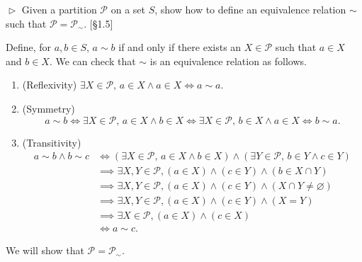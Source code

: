 \hypertarget{Exercise I.1.3}{}
\begin{problem}[1.3]
	$\vartriangleright$ Given a partition $\mathscr{P}$ on a set $S$, show how to define an equivalence relation $\sim$ such that $\mathscr{P} = \mathscr{P}_{\sim}$. [\S1.5]
\end{problem}

\begin{solution}
	Define, for $a,b\in S$, $a\sim b$ if and only if there exists
	an $X\in\mathscr{P}$ such that $a\in X$ and $b\in X$. We can check that $\sim$ is an equivalence relation as follows.
	\begin{enumerate}
		\item (Reflexivity) $\exists X\in\mathscr{P},\,a\in X \land a\in X\iff a\sim a$.
		\item (Symmetry) \[a\sim b\iff\exists X\in\mathscr{P},\,a\in X \land b\in X\iff\exists X\in\mathscr{P},\,b\in X \land a\in X\iff b\sim a.\]
		\item (Transitivity) 
		\begin{align*}
			a\sim b\land b\sim c&\iff\left(\exists X\in\mathscr{P},\,a\in X \land b\in X\right)\land\left(\exists Y\in\mathscr{P},\,b\in Y \land c\in Y\right)\\
			&\implies \exists X, Y\in\mathscr{P}, \left(a\in X \right)\land\left(c\in Y\right)\land\left(b\in X\cap Y\right)\\
			&\implies \exists X, Y\in\mathscr{P}, \left(a\in X \right)\land\left(c\in Y\right)\land\left( X\cap Y\ne \varnothing\right)\\
			&\implies \exists X, Y\in\mathscr{P}, \left(a\in X \right)\land\left(c\in Y\right)\land\left( X= Y\right)\\
			&\implies\exists X\in\mathscr{P},\left(a\in X\right)\land (c\in X)\\
			&\iff 	a\sim c.
		\end{align*}
	\end{enumerate}
	We will show that
	$\mathscr{P} = \mathscr{P}_{\sim}$. 
		

\end{solution}
